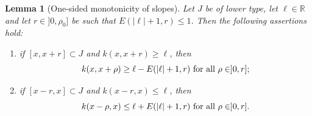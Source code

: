 \documentclass[reqno,12pt]{amsart}
\numberwithin{equation}{section}
\def\RR{{\mathds R}}
\newtheorem{lemma}[theorem]{Lemma}
\theoremstyle{remark}
\begin{document}
\begin{lemma}[One-sided monotonicity of slopes]\label{L-mono}
Let $J$ be of lower type, let $\ell\in\RR$ and let $r\in]0,\rho_0]$ be such that $E(|\ell|+1,r)\leq1$. Then the following assertions hold{\rm:}
\begin{enumerate}[leftmargin=3em, itemsep=0.6em, topsep=0.6em]
\item[{\rm(i)}] if $[x,x+r]\subset J$ and $k(x,x+r)\geq\ell$, then
\begin{equation*}
k(x,x+\rho)\geq\ell-E(|\ell|+1,r)\hbox{ for all }\rho\in]0,r];
\end{equation*}
\item[{\rm(ii)}] if $[x-r,x]\subset J$ and $k(x-r,x)\leq\ell$, then
\begin{equation*}
k(x-\rho,x)\leq\ell+E(|\ell|+1,r)\hbox{ for all }\rho\in]0,r].
\end{equation*}
\end{enumerate}
\end{lemma}
\end{document}
